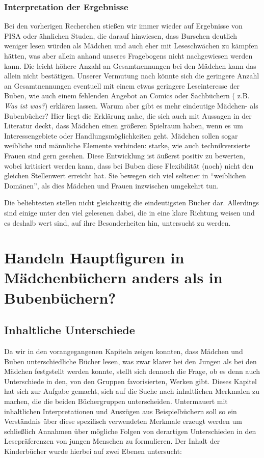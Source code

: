 \subsection{Interpretation der Ergebnisse}

Bei den vorherigen Recherchen stießen wir immer wieder auf Ergebnisse
von PISA oder ähnlichen Studen, die darauf hinwiesen, dass Burschen
deutlich weniger lesen würden als Mädchen und auch eher mit
Leseschwächen zu kämpfen hätten, was aber allein anhand unseres
Fragebogens nicht nachgewiesen werden kann. Die leicht höhere Anzahl an
Gesamtnennungen bei den Mädchen kann das allein nicht bestätigen.
Unserer Vermutung nach könnte sich die geringere Anzahl an
Gesamtnennungen eventuell mit einem etwas geringere Leseinteresse der
Buben, wie auch einem fehlenden Angebot an Comics oder Sachbüchern (
z.B. \emph{Was ist was?}) erklären lassen. Warum aber gibt es mehr
eindeutige Mädchen- als Bubenbücher? Hier liegt die Erklärung nahe, die
sich auch mit Aussagen in der Literatur deckt, dass Mädchen einen
größeren Spielraum haben, wenn es um Interessengebiete oder
Handlungsmöglichkeiten geht. Mädchen sollen sogar weibliche und
männliche Elemente verbinden: starke, wie auch technikversierte Frauen
sind gern gesehen. Diese Entwicklung ist äußerst positiv zu bewerten,
wobei kritisiert werden kann, dass bei Buben diese Flexibilität (noch)
nicht den gleichen Stellenwert erreicht hat. Sie bewegen sich viel
seltener in ``weiblichen Domänen'', als dies Mädchen und Frauen
inzwischen umgekehrt tun.

Die beliebtesten stellen nicht gleichzeitig die eindeutigsten Bücher
dar. Allerdings sind einige unter den viel gelesenen dabei, die in eine
klare Richtung weisen und es deshalb wert sind, auf ihre Besonderheiten
hin, untersucht zu werden.

\chapter{Handeln Hauptfiguren in Mädchenbüchern anders als in
Bubenbüchern?}

\section{Inhaltliche Unterschiede}

Da wir in den vorangegangenen Kapiteln zeigen konnten, dass Mädchen und
Buben unterschiedliche Bücher lesen, was zwar klarer bei den Jungen als
bei den Mädchen festgstellt werden konnte, stellt sich dennoch die
Frage, ob es denn auch Unterschiede in den, von den Gruppen
favorisierten, Werken gibt. Dieses Kapitel hat sich zur Aufgabe gemacht,
sich auf die Suche nach inhaltlichen Merkmalen zu machen, die die beiden
Büchergruppen unterscheiden. Untermauert mit inhaltlichen
Interpretationen und Auszügen aus Beispielbüchern soll so ein
Verständnis über diese spezifisch verwendeten Merkmale erzeugt werden um
schließlich Annahmen über mögliche Folgen von derartigen Unterschieden
in den Lesepräferenzen von jungen Menschen zu formulieren. Der Inhalt
der Kinderbücher wurde hierbei auf zwei Ebenen untersucht:

